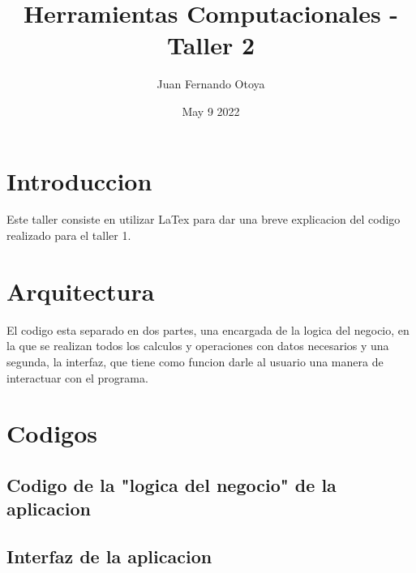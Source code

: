\documentclass{article}
\title{Herramientas Computacionales  - Taller 2}
\author{ Juan Fernando Otoya }
\date{May 9 2022}
\begin{document}
\maketitle
\tableofcontents

\newpage
\section{Introduccion}

Este taller consiste en utilizar LaTex para dar una breve explicacion del codigo realizado para el taller 1.

\section{Arquitectura}

El codigo esta separado en dos partes, una encargada de la logica del negocio, en la que se realizan todos los calculos y operaciones con datos necesarios y una segunda, la interfaz, que tiene como funcion darle al usuario una manera de interactuar con el programa.




\newpage
\section{Codigos}
\subsection{Codigo de la "logica del negocio" de la aplicacion}


\newpage
\subsection{Interfaz de la aplicacion}

\end{document}
